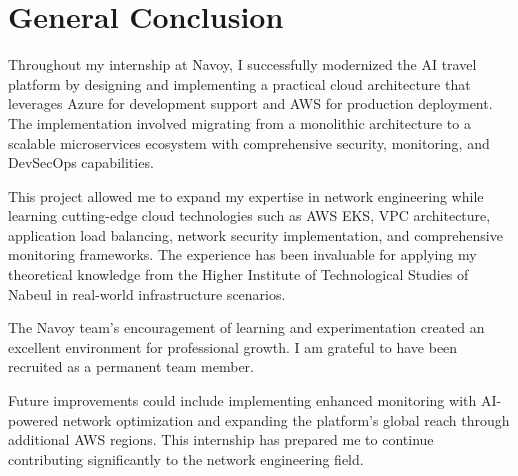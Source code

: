 \thispagestyle{plain} %
\section*{General Conclusion}
Throughout my internship at Navoy, I successfully modernized the AI travel platform by designing and implementing a practical cloud architecture that leverages Azure for development support and AWS for production deployment. The implementation involved migrating from a monolithic architecture to a scalable microservices ecosystem with comprehensive security, monitoring, and DevSecOps capabilities.

This project allowed me to expand my expertise in network engineering while learning cutting-edge cloud technologies such as AWS EKS, VPC architecture, application load balancing, network security implementation, and comprehensive monitoring frameworks. The experience has been invaluable for applying my theoretical knowledge from the Higher Institute of Technological Studies of Nabeul in real-world infrastructure scenarios.

The Navoy team's encouragement of learning and experimentation created an excellent environment for professional growth. I am grateful to have been recruited as a permanent team member.

Future improvements could include implementing enhanced monitoring with AI-powered network optimization and expanding the platform's global reach through additional AWS regions. This internship has prepared me to continue contributing significantly to the network engineering field.

\newpage
